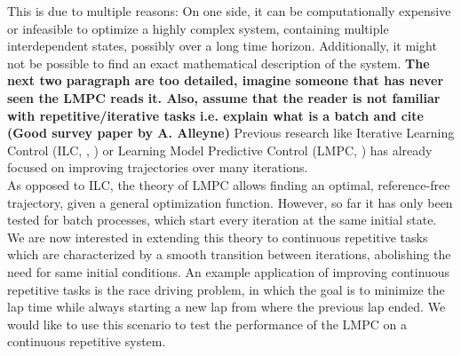 This is due to multiple reasons: On one side, it can be computationally expensive or infeasible to optimize a highly complex system, containing multiple interdependent states, possibly over a long time horizon. Additionally, it might not be possible to find an exact mathematical description of the system.
{\bfseries{The next two paragraph are too detailed, imagine someone that has never seen the LMPC reads it. Also, assume that the reader is not familiar with repetitive/iterative tasks i.e. explain what is a batch and cite (Good survey paper by A. Alleyne)}}
Previous research like Iterative Learning Control (ILC, \cite{Lee2007}, \cite{Bristow2006}) or Learning Model Predictive Control (LMPC, \cite{Rosolia2016}) has already focused on improving trajectories over many iterations.\\
As opposed to ILC, the theory of LMPC allows finding an optimal, reference-free trajectory, given a general optimization function. However, so far it has only been tested for batch processes, which start every iteration at the same initial state.\\
We are now interested in extending this theory to continuous repetitive tasks which are characterized by a smooth transition between iterations, abolishing the need for same initial conditions.
An example application of improving continuous repetitive tasks is the race driving problem, in which the goal is to minimize the lap time while always starting a new lap from where the previous lap ended. We would like to use this scenario to test the performance of the LMPC on a continuous repetitive system.

